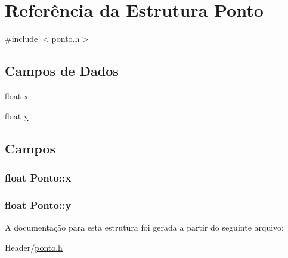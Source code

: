 \hypertarget{structPonto}{
\section{Referência da Estrutura Ponto}
\label{structPonto}
}


{\ttfamily \#include $<$ponto.h$>$}

\subsection*{Campos de Dados}
\begin{DoxyCompactItemize}
\item 
float \hyperlink{structPonto_ac72a5274f1b887279fe959d0eca1eaa8}{x}
\item 
float \hyperlink{structPonto_aa3d21f6f0e8a9fb0591c982f03cbb26a}{y}
\end{DoxyCompactItemize}


\subsection{Campos}
\hypertarget{structPonto_ac72a5274f1b887279fe959d0eca1eaa8}{
\subsubsection[{x}]{\setlength{\rightskip}{0pt plus 5cm}float {\bf Ponto::x}}}
\label{structPonto_ac72a5274f1b887279fe959d0eca1eaa8}
\hypertarget{structPonto_aa3d21f6f0e8a9fb0591c982f03cbb26a}{
\subsubsection[{y}]{\setlength{\rightskip}{0pt plus 5cm}float {\bf Ponto::y}}}
\label{structPonto_aa3d21f6f0e8a9fb0591c982f03cbb26a}


A documentação para esta estrutura foi gerada a partir do seguinte arquivo:\begin{DoxyCompactItemize}
\item 
Header/\hyperlink{ponto_8h}{ponto.h}\end{DoxyCompactItemize}
